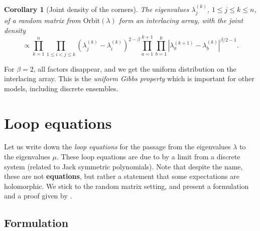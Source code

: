 \documentclass[letterpaper,11pt,oneside,reqno]{book}
\numberwithin{equation}{chapter}  %
\newtheorem{corollary}[proposition]{Corollary}
\theoremstyle{definition}
\begin{document}
\begin{corollary}[Joint density of the corners]
	\label{lecture8:cor:corners_density}
	The eigenvalues $\lambda^(k)_j$, $1\le j\le k\le n$,
	of a random matrix from $\mathrm{Orbit}(\lambda)$
	form an interlacing array, with the joint density
	\begin{equation*}
		\propto
		\prod_{k=1}^n
		\prod_{1\le i<j\le k}\left(\lambda_j^{(k)}-\lambda_i^{(k)}\right)^{2-\beta}
		\prod_{a=1}^{k+1}\prod_{b=1}^k
		\left|\lambda_a^{(k+1)}-\lambda_b^{(k)}\right|^{\beta/2-1}.
	\end{equation*}
\end{corollary}
For $\beta=2$, all factors disappear, and we get the
uniform distribution on the interlacing array. This is the \emph{uniform Gibbs property}
which is important for other models, including discrete ensembles.


\section{Loop equations}

Let us write down the \emph{loop equations} for the passage from the
eigenvalues $\lambda$ to the eigenvalues $\mu$.
These loop equations are due to \cite{gorin2022dynamical}
by a limit from a discrete system (related to Jack
symmetric polynomials). Note that despite the name, these are not \textbf{equations},
but rather a statement that some expectations are holomorphic.
We stick to the random matrix setting, and
present a formulation and a proof given by \cite{gorin2025private}.

\subsection{Formulation}
\end{document}
